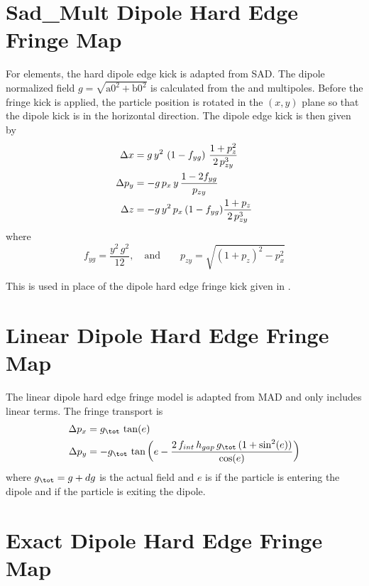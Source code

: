 \section{Sad\_Mult Dipole Hard Edge Fringe Map} 
\label{s:sad.mult.bend.fringe}

For  elements, the hard dipole edge kick is adapted from SAD. The dipole normalized
field $g = \sqrt{\text{a0}^2 + \text{b0}^2}$ is calculated from the  and 
multipoles. Before the fringe kick is applied, the particle position is rotated in the $(x,y)$ plane
so that the dipole kick is in the horizontal direction. The dipole edge kick is then given by
\begin{align}
  \Delta x &= g \, y^2 \, \left( 1 - f_{yg} \right) \, \frac{1 + p_z^2}{2 \, p_{zy}^3} \nonumber \\
  \Delta p_y &= -g \, p_x \, y \, \frac{1 - 2f_{yg}}{p_{zy}} \\
  \Delta z &= -g \, y^2 \, p_x \, (1 - f_{yg}) \frac{1 + p_z}{2 \, p_{zy}^3} \nonumber
\end{align}
where
\begin{equation}
  f_{yg} = \frac{y^2 \, g^2}{12}, \quad \text{and} \qquad
  p_{zy} = \sqrt{(1+p_z)^2 - p_x^2}
\end{equation}

This is used in place of the dipole hard edge fringe kick given in .

\section{Linear Dipole Hard Edge Fringe Map}
\label{s:lin.dip.fringe}

The linear dipole hard edge fringe model is adapted from MAD\cite{b:mad} and only includes linear
terms. The fringe transport is
\begin{align}
  \Delta p_x &= g_\tot \, \tan(e) \CRNO
  \Delta p_y &= -g_\tot \, \tan \left( e - 
    \frac{2 \, f_{int} \, h_{gap} \, g_\tot \, (1 + \sin^2(e))}{\cos(e)} \right)
\end{align}
where $g_\tot = g + dg$ is the actual field and $e$ is  if the particle is entering the
dipole and  if the particle is exiting the dipole.

\section{Exact Dipole Hard Edge Fringe Map}
\label{s:lin.dip.fringe}

